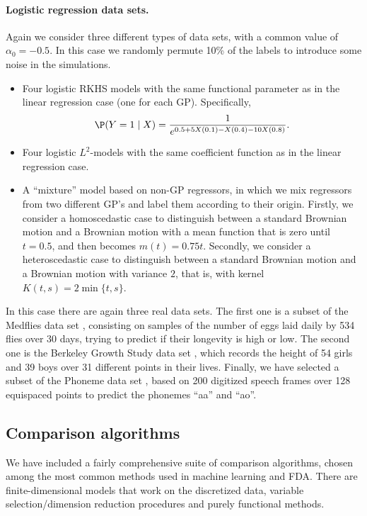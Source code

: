 \paragraph{Logistic regression data sets.} Again we consider three different types of data sets,  with a common value of \(\alpha_0=-0.5\). In this case we randomly permute 10\% of the labels to introduce some noise in the simulations.
\begin{itemize}
  \item Four logistic RKHS models with the same functional parameter as in the linear regression case (one for each GP). Specifically,
  \[
  \P(Y=1\mid X) = \frac{1}{e^{0.5 +5X(0.1) - X(0.4) - 10X(0.8)}}.
  \]
  \item Four logistic \(L^2\)-models with the same coefficient function as in the linear regression case.
  \item A ``mixture'' model based on non-GP regressors, in which we mix regressors from two different GP's and label them according to their origin. Firstly, we consider a homoscedastic case to distinguish between a standard Brownian motion and a Brownian motion with a mean function that is zero until \(t=0.5\), and then becomes \(m(t)=0.75t\). Secondly, we consider a heteroscedastic case to distinguish between a standard Brownian motion and a Brownian motion with variance \(2\), that is, with kernel \(K(t,s)=2\min\{t,s\}\).
\end{itemize}
In this case there are again three real data sets. The first one is a subset of the Medflies data set \citep{carey1998relationship}, consisting on samples of the number of eggs laid daily by 534 flies over 30 days, trying to predict if their longevity is high or low. The second one is the Berkeley Growth Study data set \citep{tuddenham1954physical}, which records the height of 54 girls and 39 boys over 31 different points in their lives. Finally, we have selected a subset of the Phoneme data set \citep{hastie1995penalized}, based on 200 digitized speech frames over 128 equispaced points to predict the phonemes ``aa'' and ``ao''.

\subsection*{Comparison algorithms}

We have included a fairly comprehensive suite of comparison algorithms, chosen among the most common methods used in machine learning and FDA. There are finite-dimensional models that work on the discretized data, variable selection/dimension reduction procedures and purely functional methods.

